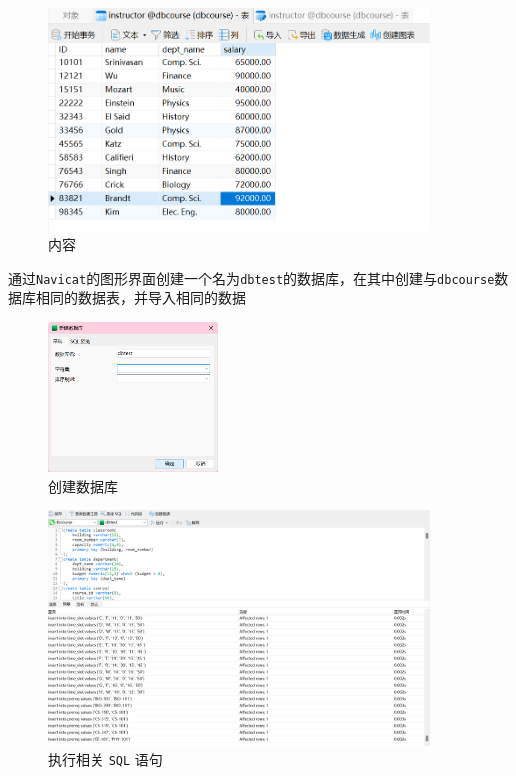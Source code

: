 \documentclass{article}
\begin{document}
\begin{figure}[H]
\centering
\includegraphics[width=0.9\textwidth]{img/23.png}
\caption{内容}
\end{figure}

通过\texttt{Navicat}的图形界面创建一个名为\texttt{dbtest}的数据库，在其中创建与\texttt{dbcourse}数据库相同的数据表，并导入相同的数据

\begin{figure}[H]
\centering
\includegraphics[width=0.4\textwidth]{img/24.png}
\caption{创建数据库}
\end{figure}

\begin{figure}[H]
\centering
\includegraphics[width=0.9\textwidth]{img/25.png}
\caption{执行相关 \texttt{SQL} 语句}
\end{figure}
\end{document}
